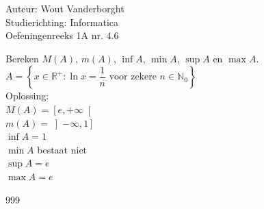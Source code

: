 \documentclass[a4paper]{article}
\begin{document}
  
\noindent \large Auteur: Wout Vanderborght\\
\noindent \large Studierichting: Informatica\\
\noindent \large Oefeningenreeks 1A nr. 4.6\\

\medskip

\normalsize
Bereken $M(A)$, $m(A)$, $\inf A$, $\min A$, $\sup A$ en $\max A$. \\

$ A = \left\{x \in \mathbb{R}^+: \ln{x} = \dfrac{1}{n} \text{ voor zekere } n \in \mathbb{N}_0 \right\} $ \\

Oplossing: \\

$ M(A) = \left[e, +\infty\right[ $ \\

$ m(A) = \left]-\infty, 1\right] $ \\

$ \inf A = 1 $ \\

$ \min A $ bestaat niet \\

$ \sup A = e $ \\

$ \max A = e $ \\

\begin{thebibliography}{999}
\end{thebibliography}
\end{document}
